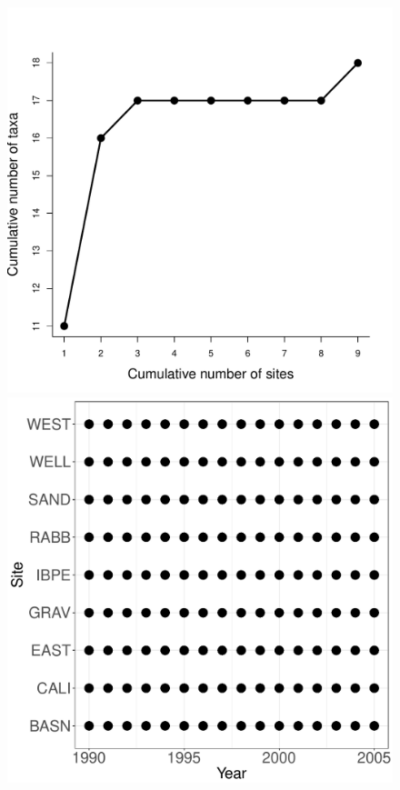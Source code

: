 \documentclass[11pt, oneside]{article}
\begin{document}
\begin{figure}[h!]
\includegraphics[scale = 0.4]{jrn-lizards-hope_species_accumulation_space.pdf}
\includegraphics[scale = 0.4]{jrn-lizards-hope_spatiotemporal_sampling_effort.pdf}

\end{figure}
\end{document}
